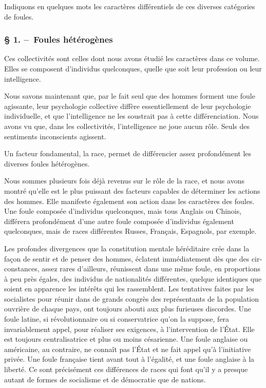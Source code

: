 \documentclass[french,twoside]{book} %
\begin{document}
\noindent Indiquons en quelques mots les caractères différentiels de ces diverses catégories de foules.\par
\subsubsection[{§ 1. – Foules hétérogènes}]{§ 1. – Foules hétérogènes}
\noindent Ces collectivités sont celles dont nous avons étudié les caractères dans ce volume. Elles se composent d’individus quelconques, quelle que soit leur profession ou leur intelligence.\par
Nous savons maintenant que, par le fait seul que des hommes forment une foule agissante, leur psychologie collective diffère essentiellement de leur psychologie individuelle, et que l’intelligence ne les soustrait pas à cette différenciation. Nous avons vu que, dans les collectivités, l’intelligence ne joue aucun rôle. Seuls des senti­ments inconscients agissent.\par
Un facteur fondamental, la race, permet de différencier assez profondément les diverses foules hétérogènes.\par
Nous sommes plusieurs fois déjà revenus sur le rôle de la race, et nous avons montré qu’elle est le plus puissant des facteurs capables de déterminer les actions des hommes. Elle manifeste également son action dans les caractères des foules. Une foule composée d’individus quelconques, mais tous Anglais ou Chinois, différera pro­fondément d’une autre foule composée d’individus également quelconques, mais de races différentes Russes, Français, Espagnols, par exemple.\par
Les profondes divergences que la constitution mentale héréditaire crée dans la façon de sentir et de penser des hommes, éclatent immédiatement dès que des cir­constances, assez rares d’ailleurs, réunissent dans une même foule, en proportions à peu près égales, des individus de nationalités différentes, quelque identiques que soient en apparence les intérêts qui les rassemblent. Les tentatives faites par les socialistes pour réunir dans de grands congrès des représentants de la population ouvrière de chaque pays, ont toujours abouti aux plus furieuses discordes. Une foule latine, si révolutionnaire ou si conservatrice qu’on la suppose, fera invariablement appel, pour réaliser ses exigences, à l’intervention de l’État. Elle est toujours centra­lisatrice et plus ou moins césarienne. Une foule anglaise ou américaine, au con­traire, ne connaît pas l’État et ne fait appel qu’à l’initiative privée. Une foule française tient avant tout à l’égalité, et une foule anglaise à la liberté. Ce sont précisément ces différences de races qui font qu’il y a presque autant de formes de socialisme et de démocratie que de nations.\par
\end{document}
